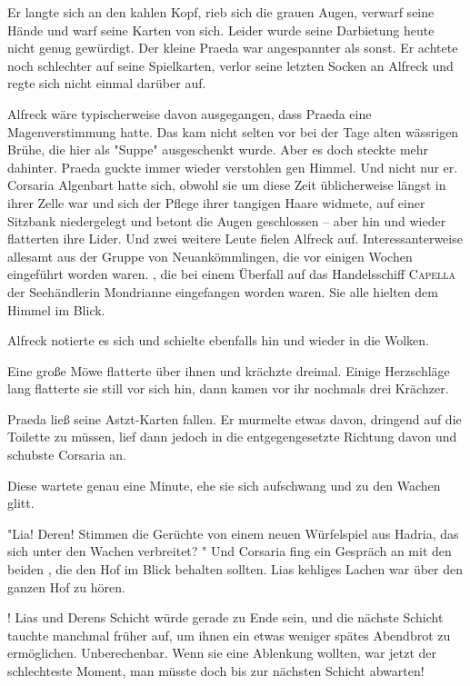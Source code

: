 Er langte sich an den kahlen Kopf, rieb sich die grauen Augen, verwarf seine Hände und warf seine Karten von sich. Leider wurde seine Darbietung heute nicht genug gewürdigt. Der kleine Praeda war angespannter als sonst. Er achtete noch schlechter auf seine Spielkarten, verlor seine letzten Socken an Alfreck und regte sich nicht einmal darüber auf. 

Alfreck wäre typischerweise davon ausgegangen, dass Praeda eine Magenverstimmung hatte. Das kam nicht selten vor bei der Tage alten wässrigen Brühe, die hier als "Suppe" ausgeschenkt wurde. Aber es doch steckte mehr dahinter. Praeda guckte immer wieder verstohlen gen Himmel. Und nicht nur er. Corsaria Algenbart hatte sich, obwohl sie um diese Zeit üblicherweise längst in ihrer Zelle war und sich der Pflege ihrer tangigen Haare widmete, auf einer Sitzbank niedergelegt und betont die Augen geschlossen – aber hin und wieder flatterten ihre Lider. Und zwei weitere Leute fielen Alfreck auf. Interessanterweise allesamt aus der Gruppe von Neuankömmlingen, die vor einigen Wochen eingeführt worden waren. , die bei einem Überfall auf das Handelsschiff \textsc{Capella} der Seehändlerin Mondrianne eingefangen worden waren. Sie alle hielten dem Himmel im Blick.

Alfreck notierte es sich und schielte ebenfalls hin und wieder in die Wolken.

Eine große Möwe flatterte über ihnen und krächzte dreimal. Einige Herzschläge lang flatterte sie still vor sich hin, dann kamen vor ihr nochmals drei Krächzer.

Praeda ließ seine Astzt-Karten fallen. Er murmelte etwas davon, dringend auf die Toilette zu müssen, lief dann jedoch in die entgegengesetzte Richtung davon und schubste Corsaria an.

Diese wartete genau eine Minute, ehe sie sich aufschwang und zu den Wachen glitt.

"Lia! Deren! Stimmen die Gerüchte von einem neuen Würfelspiel aus Hadria, das sich unter den Wachen verbreitet? " Und Corsaria fing ein Gespräch an mit den beiden , die den Hof im Blick behalten sollten. Lias kehliges Lachen war über den ganzen Hof zu hören.

! Lias und Derens Schicht würde gerade zu Ende sein, und die nächste Schicht tauchte manchmal früher auf, um ihnen ein etwas weniger spätes Abendbrot zu ermöglichen. Unberechenbar. Wenn sie eine Ablenkung wollten, war jetzt der schlechteste Moment, man müsste doch bis zur nächsten Schicht abwarten!

